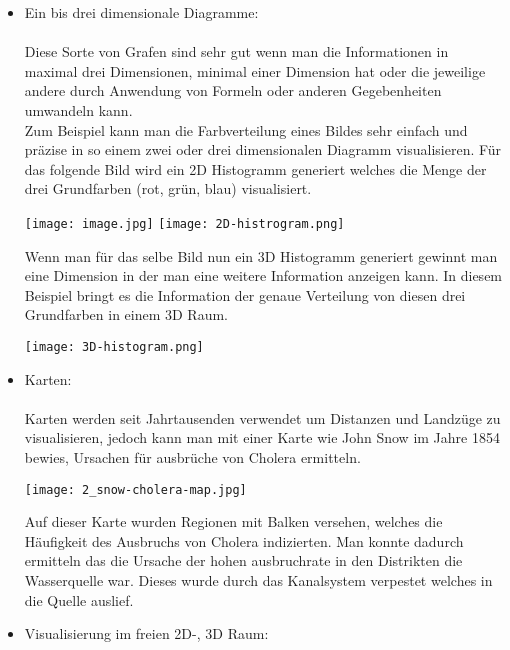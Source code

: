 \begin{itemize}
    \item{Ein bis drei dimensionale Diagramme:} \\ \\
        Diese Sorte von Grafen sind sehr gut wenn man die Informationen in maximal drei Dimensionen, minimal einer Dimension hat oder die
        jeweilige andere durch Anwendung von Formeln oder anderen Gegebenheiten umwandeln kann. \\
        Zum Beispiel kann man die Farbverteilung eines Bildes sehr einfach und präzise in so einem zwei oder drei dimensionalen Diagramm
        visualisieren. Für das folgende Bild wird ein 2D Histogramm generiert welches die Menge der drei Grundfarben (rot, grün, blau)
        visualisiert.
        \begin{center}
            \texttt{[image: image.jpg]}
            \texttt{[image: 2D-histrogram.png]}
        \end{center}
        \newpage \noindent
        Wenn man für das selbe Bild nun ein 3D Histogramm generiert gewinnt man eine Dimension in der man eine weitere Information anzeigen
        kann. In diesem Beispiel bringt es die Information der genaue Verteilung von diesen drei Grundfarben in einem 3D Raum.
        \begin{center}
            \texttt{[image: 3D-histogram.png]}
        \end{center}
        \newpage \noindent
    \item{Karten:} \\ \\
        Karten werden seit Jahrtausenden verwendet um Distanzen und Landzüge zu visualisieren, jedoch kann man mit einer Karte wie John Snow
        im Jahre 1854 bewies, Ursachen für ausbrüche von Cholera ermitteln.\cite{bestvisualizations}
        \begin{center}
            \texttt{[image: 2\_snow-cholera-map.jpg]}\cite{choleramap}
        \end{center}
        Auf dieser Karte wurden Regionen mit Balken versehen, welches die Häufigkeit des Ausbruchs von Cholera indizierten. Man
        konnte dadurch ermitteln das die Ursache der hohen ausbruchrate in den Distrikten die Wasserquelle war. Dieses wurde durch das
        Kanalsystem verpestet welches in die Quelle auslief.\cite{bestvisualizations}
        \newpage \noindent
    \item{Visualisierung im freien 2D-, 3D Raum:} \\ \\

\end{itemize}
